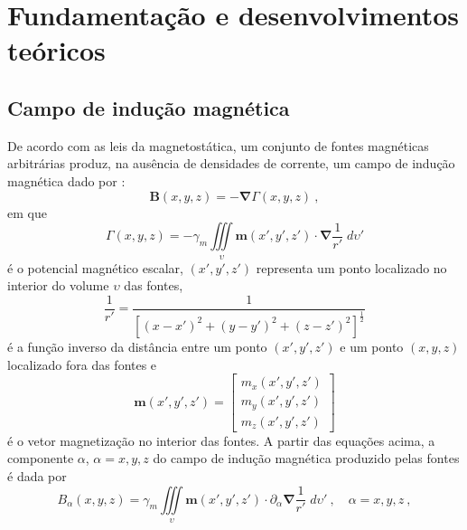 \chapter{Fundamentação e desenvolvimentos teóricos}
\label{chap:fundamentacao}


\section{Campo de indução magnética}
\label{sec:campo}

De acordo com as leis da magnetostática, um conjunto de fontes magnéticas arbitrárias produz, 
na ausência de densidades de corrente, um campo de indução magnética dado por 
\citep[e.g., ][ p. 175, 193]{jackson1975}:
\begin{equation}
\mathbf{B}(x, y, z) = - \boldsymbol{\nabla} \Gamma(x, y, z) \: ,
\label{eq:B-true-generic}
\end{equation}
em que 
\begin{equation}
\Gamma(x, y, z) = - \gamma_{m} \iiint\limits_{\upsilon} \mathbf{m}(x', y', z') \cdot \boldsymbol{\nabla} \frac{1}{r'} 
\; d\upsilon'
\label{eq:Gamma-potential}
\end{equation}
é o potencial magnético escalar, $(x', y', z')$ representa um ponto localizado no interior do 
volume $\upsilon$ das fontes, 
\begin{equation}
\frac{1}{r'} = \frac{1}{\left[ (x - x')^{2} + (y - y')^{2} + (z - z')^{2} \right]^{\frac{1}{2}}}
\label{eq:inv-r'}
\end{equation}
é a função inverso da distância entre um ponto $(x', y', z')$ e um ponto $(x, y, z)$ localizado fora
das fontes e 
\begin{equation}
\mathbf{m}(x', y', z') = \begin{bmatrix}
m_{x}(x', y', z') \\
m_{y}(x', y', z') \\
m_{z}(x', y', z')
\end{bmatrix}
\label{eq:mag-vector-true-generic}
\end{equation}
é o vetor magnetização no interior das fontes.
A partir das equações acima, a componente $\alpha$, $\alpha = x, y, z$ do campo de indução 
magnética produzido pelas fontes é dada por
\begin{equation}
B_{\alpha}(x, y, z) = \gamma_{m} \iiint\limits_{\upsilon} 
\mathbf{m}(x', y', z') \cdot \partial_{\alpha} \boldsymbol{\nabla} \frac{1}{r'} 
\; d\upsilon' \: , \quad \alpha = x, y, z \: ,
\label{eq:B-alpha-true-generic}
\end{equation}
